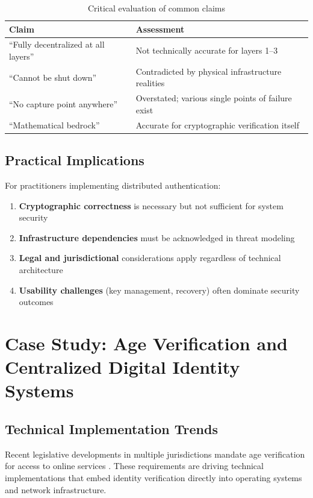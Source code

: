 \documentclass[11pt,a4paper]{article}
\begin{document}
\begin{table}[h]
\centering
\caption{Critical evaluation of common claims}
\begin{tabular}{@{}lp{8cm}@{}}
\toprule
\textbf{Claim} & \textbf{Assessment} \\
\midrule
``Fully decentralized at all layers'' & Not technically accurate for layers 1--3 \\
``Cannot be shut down'' & Contradicted by physical infrastructure realities \\
``No capture point anywhere'' & Overstated; various single points of failure exist \\
``Mathematical bedrock'' & Accurate for cryptographic verification itself \\
\bottomrule
\end{tabular}
\end{table}

\subsection{Practical Implications}

For practitioners implementing distributed authentication:

\begin{enumerate}
    \item \textbf{Cryptographic correctness} is necessary but not sufficient for system security
    \item \textbf{Infrastructure dependencies} must be acknowledged in threat modeling
    \item \textbf{Legal and jurisdictional} considerations apply regardless of technical architecture
    \item \textbf{Usability challenges} (key management, recovery) often dominate security outcomes
\end{enumerate}

\section{Case Study: Age Verification and Centralized Digital Identity Systems}

\subsection{Technical Implementation Trends}

Recent legislative developments in multiple jurisdictions mandate age verification for access to online services \citep{uk2023, france2023}. These requirements are driving technical implementations that embed identity verification directly into operating systems and network infrastructure.
\end{document}
